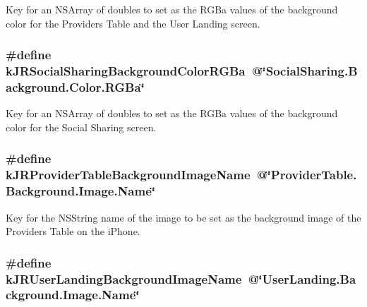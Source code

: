 \label{group__custom_interface_gae0c84a976949aa4eccecc123786efb3c}
Key for an {\ttfamily NSArray} of doubles to set as the RGBa values of the background color for the Providers Table and the User Landing screen. \hypertarget{group__custom_interface_ga6554a101f0e2e9474a77262143dc528b}{
\subsubsection[{kJRSocialSharingBackgroundColorRGBa}]{\setlength{\rightskip}{0pt plus 5cm}\#define kJRSocialSharingBackgroundColorRGBa~@\char`\"{}SocialSharing.Background.Color.RGBa\char`\"{}}}
\label{group__custom_interface_ga6554a101f0e2e9474a77262143dc528b}
Key for an {\ttfamily NSArray} of doubles to set as the RGBa values of the background color for the Social Sharing screen. \hypertarget{group__custom_interface_ga893fb6e20be0c6658e81a6a5d5c121f0}{
\subsubsection[{kJRProviderTableBackgroundImageName}]{\setlength{\rightskip}{0pt plus 5cm}\#define kJRProviderTableBackgroundImageName~@\char`\"{}ProviderTable.Background.Image.Name\char`\"{}}}
\label{group__custom_interface_ga893fb6e20be0c6658e81a6a5d5c121f0}
Key for the {\ttfamily NSString} name of the image to be set as the background image of the Providers Table on the iPhone. \hypertarget{group__custom_interface_gadda3f945ba5012762eb92764b251b918}{
\subsubsection[{kJRUserLandingBackgroundImageName}]{\setlength{\rightskip}{0pt plus 5cm}\#define kJRUserLandingBackgroundImageName~@\char`\"{}UserLanding.Background.Image.Name\char`\"{}}}
\label{group__custom_interface_gadda3f945ba5012762eb92764b251b918}
